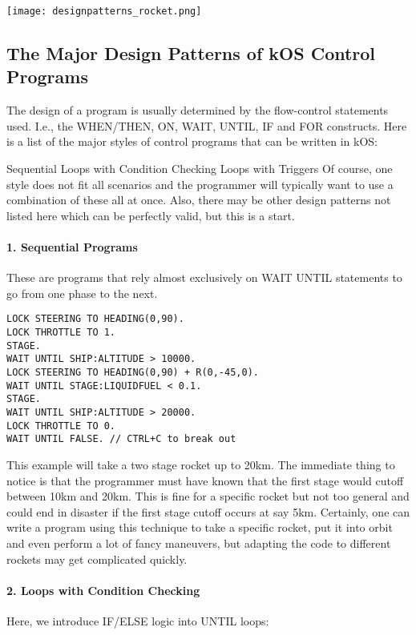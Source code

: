 \begin{center}
\texttt{[image: designpatterns\_rocket.png]}
\end{center}

\subsection{The Major Design Patterns of kOS Control Programs}
The design of a program is usually determined by the flow-control statements used. I.e., the WHEN/THEN, ON, WAIT, UNTIL, IF and FOR constructs. Here is a list of the major styles of control programs that can be written in kOS:

Sequential
Loops with Condition Checking
Loops with Triggers
Of course, one style does not fit all scenarios and the programmer will typically want to use a combination of these all at once. Also, there may be other design patterns not listed here which can be perfectly valid, but this is a start.

\paragraph{1. Sequential Programs}
These are programs that rely almost exclusively on WAIT UNTIL statements to go from one phase to the next.

\begin{Verbatim}[frame=single]
LOCK STEERING TO HEADING(0,90).
LOCK THROTTLE TO 1.
STAGE.
WAIT UNTIL SHIP:ALTITUDE > 10000.
LOCK STEERING TO HEADING(0,90) + R(0,-45,0).
WAIT UNTIL STAGE:LIQUIDFUEL < 0.1.
STAGE.
WAIT UNTIL SHIP:ALTITUDE > 20000.
LOCK THROTTLE TO 0.
WAIT UNTIL FALSE. // CTRL+C to break out
\end{Verbatim} 

This example will take a two stage rocket up to 20km. The immediate thing to notice is that the programmer must have known that the first stage would cutoff between 10km and 20km. This is fine for a specific rocket but not too general and could end in disaster if the first stage cutoff occurs at say 5km. Certainly, one can write a program using this technique to take a specific rocket, put it into orbit and even perform a lot of fancy maneuvers, but adapting the code to different rockets may get complicated quickly.

\paragraph{2. Loops with Condition Checking}
Here, we introduce IF/ELSE logic into UNTIL loops:


